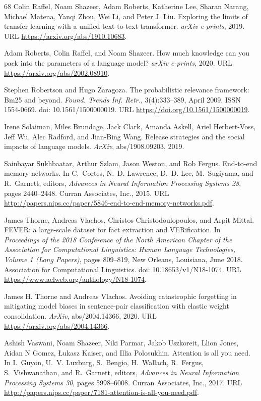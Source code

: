 \documentclass[10pt,letterpaper]{article}
\begin{document}
{\begin{thebibliography}{68}
 Colin Raffel, Noam Shazeer, Adam Roberts, Katherine Lee, Sharan
Narang, Michael Matena, Yanqi Zhou, Wei Li, and Peter J. Liu. Exploring the
limits of transfer learning with a unified text-to-text transformer.
\emph{arXiv e-prints}, 2019. URL \url{https://arxiv.org/abs/1910.10683}.

 Adam Roberts, Colin Raffel, and Noam Shazeer. How much knowledge
can you pack into the parameters of a language model? \emph{arXiv e-prints},
2020. URL \url{https://arxiv.org/abs/2002.08910}.

 Stephen Robertson and Hugo Zaragoza. The probabilistic relevance
framework: Bm25 and beyond. \emph{Found. Trends Inf. Retr.}, 3(4):333--389,
April 2009. ISSN 1554-0669. doi: 10.1561/1500000019. URL
\url{https://doi.org/10.1561/1500000019}.

 Irene Solaiman, Miles Brundage, Jack Clark, Amanda Askell, Ariel
Herbert-Voss, Jeff Wu, Alec Radford, and Jian-Bing Wang. Release strategies and
the social impacts of language models. \emph{ArXiv}, abs/1908.09203, 2019.

 Sainbayar Sukhbaatar, Arthur Szlam, Jason Weston, and Rob Fergus.
End-to-end memory networks. In C.~Cortes, N.~D. Lawrence, D.~D. Lee,
M.~Sugiyama, and R.~Garnett, editors, \emph{Advances in Neural Information
Processing Systems 28}, pages 2440--2448. Curran Associates, Inc., 2015. URL
\url{http://papers.nips.cc/paper/5846-end-to-end-memory-networks.pdf}.

 James Thorne, Andreas Vlachos, Christos Christodoulopoulos, and
Arpit Mittal. FEVER: a large-scale dataset for fact extraction and
VERification. In \emph{Proceedings of the 2018 Conference of the North American
Chapter of the Association for Computational Linguistics: Human Language
Technologies, Volume 1 (Long Papers)}, pages 809--819, New Orleans, Louisiana,
June 2018. Association for Computational Linguistics. doi:
10.18653/v1/N18-1074. URL \url{https://www.aclweb.org/anthology/N18-1074}.

 James H. Thorne and Andreas Vlachos. Avoiding catastrophic
forgetting in mitigating model biases in sentence-pair classification with
elastic weight consolidation. \emph{ArXiv}, abs/2004.14366, 2020. URL
\url{https://arxiv.org/abs/2004.14366}.

 Ashish Vaswani, Noam Shazeer, Niki Parmar, Jakob Uszkoreit, Llion
Jones, Aidan N Gomez, Łukasz Kaiser, and Illia Polosukhin. Attention is all you
need. In I.~Guyon, U.~V. Luxburg, S.~Bengio, H.~Wallach, R.~Fergus,
S.~Vishwanathan, and R.~Garnett, editors, \emph{Advances in Neural Information
Processing Systems 30}, pages 5998--6008. Curran Associates, Inc., 2017. URL
\url{http://papers.nips.cc/paper/7181-attention-is-all-you-need.pdf}.


\end{thebibliography}}
\end{document}
